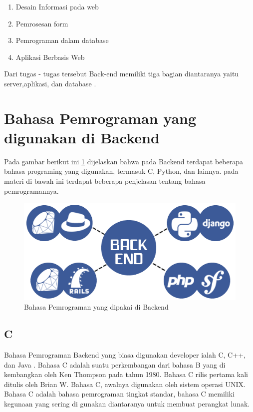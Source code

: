 \begin{enumerate}
\item Desain Informasi pada web
\item Pemrosesan form
\item Pemrograman dalam database
\item Aplikasi Berbasis Web
\end{enumerate}
Dari tugas - tugas tersebut Back-end memiliki tiga bagian diantaranya yaitu server,aplikasi, dan database
\cite{shapiro2005system}.

\section{Bahasa Pemrograman yang digunakan di Backend}
Pada gambar berikut ini \ref{labelgambar} dijelaskan bahwa pada Backend terdapat beberapa bahasa programing yang digunakan,
termasuk C, Python, dan lainnya. pada materi di bawah ini terdapat beberapa penjelasan tentang bahasa pemrogramannya.

\begin{figure}[h]
\centerline{\includegraphics[width=1\textwidth]{figures/3bahasa.png}}
\caption{Bahasa Pemrograman yang dipakai di Backend}
\label{labelgambar}
\end{figure}

\subsection{C}
	Bahasa Pemrograman Backend yang biasa digunakan developer ialah C, C++, dan Java .
Bahasa C adalah suatu perkembangan dari bahasa B yang di kembangkan oleh Ken Thompson pada tahun 1980.
Bahasa C rilis pertama kali ditulis oleh Brian W. Bahasa C, awalnya digunakan oleh sistem operasi UNIX.
Bahasa C adalah bahasa pemrograman tingkat standar, bahasa C memiliki kegunaan yang sering di gunakan
diantaranya untuk membuat perangkat lunak.


